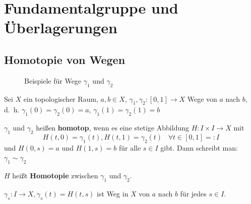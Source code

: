 \chapter{Fundamentalgruppe und Überlagerungen}
\section{Homotopie von Wegen}
\begin{figure}[ht]
    \centering
    \hspace{1em}%
    \label{fig:paths-homotop-example-counterexample}
    \caption{Beispiele für Wege $\gamma_1$ und $\gamma_2$}
\end{figure}

\begin{definition}
    Sei $X$ ein topologischer Raum, $a, b \in X$, 
    $\gamma_1, \gamma_2: [0,1] \rightarrow X$ Wege von $a$ nach $b$,
    d.~h. $\gamma_1(0) = \gamma_2(0) = a$, $\gamma_1(1) = \gamma_2(1) = b$

    \begin{defenum}
        \item $\gamma_1$ und $\gamma_2$ heißen \textbf{homotop},
              wenn es eine stetige Abbildung $H : I \times I \rightarrow X$ mit
              \[H(t,0) = \gamma_1(t), H(t,1) = \gamma_2(t) \;\;\; \forall t \in [0,1] =: I \]
              und $H(0,s) = a$ und $H(1,s) = b$ für alle $s \in I$ gibt.
              Dann schreibt man: $\gamma_1 \sim \gamma_2$

              $H$ heißt \textbf{Homotopie} zwischen
              $\gamma_1$ und $\gamma_2$.
        \item $\gamma_s: I \rightarrow X, \gamma_s(t) = H(t,s)$ ist
              Weg in $X$ von $a$ nach $b$ für jedes $s \in I$.
    \end{defenum}
\end{definition}

